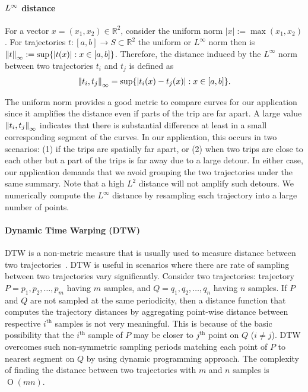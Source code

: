 \paragraph{$L^\infty$ distance}
For a vector $x=(x_1,x_2) \in \mathbb{R}^2$, consider the uniform norm $|x|:=\max{(x_1,x_2)}$. For trajectories $t:[a,b]\rightarrow S \subset \mathbb{R}^2$ the uniform or $L^\infty $ norm then is $\left\lVert t\right\rVert_\infty:=\sup\{|t(x)|:x \in [a,b]\}$. Therefore, the distance induced by the $L^\infty$ norm between two trajectories $t_i$ and $t_j$ is defined as
\begin{align}
\left\lVert t_i,t_j\right\rVert_\infty = \sup\{|t_i(x)-t_j(x)|: x \in [a,b]\}.
\end{align}

The uniform norm provides a good metric to compare curves for our application since it amplifies the distance even if parts of the trip are far apart. A large value $\left\lVert t_i,t_j\right\rVert_\infty$ indicates that there is substantial difference at least in a small corresponding segment of the curves. In our application, this occurs in two scenarios: (1) if the trips are spatially far apart, or (2) when two trips are close to each other but a part of the trips is far away due to a large detour. In either case, our application demands that we avoid grouping the two trajectories under the same summary. Note that a high $L^2$ distance will not amplify such detours. We numerically compute the $L^\infty$ distance by resampling each trajectory into a large number of points.

\paragraph{Dynamic Time Warping (DTW)}
DTW is a non-metric measure that is usually used to measure distance between two trajectories~\cite{Yi1998}. DTW is useful in scenarios where there are rate of sampling between two trajectories vary significantly. Consider two trajectories: trajectory $P={p_1, p_2,\ldots,p_m}$ having $m$ samples, and $Q={q_1, q_2,\ldots,q_n}$ having $n$ samples. If $P$ and $Q$ are not sampled at the same periodicity, then a distance function that computes the trajectory distances by aggregating point-wise distance between respective $i^\text{th}$ samples is not very meaningful. This is because of the basic possibility that the $i^\text{th}$ sample of $P$ may be closer to $j^\text{th}$ point on $Q$ ($i \neq j$). DTW overcomes such non-symmetric sampling periods matching each point of $P$ to nearest segment on $Q$ by using dynamic programming approach. The complexity of finding the distance between two trajectories with $m$ and $n$ samples is $\operatorname{O}(mn)$. 

